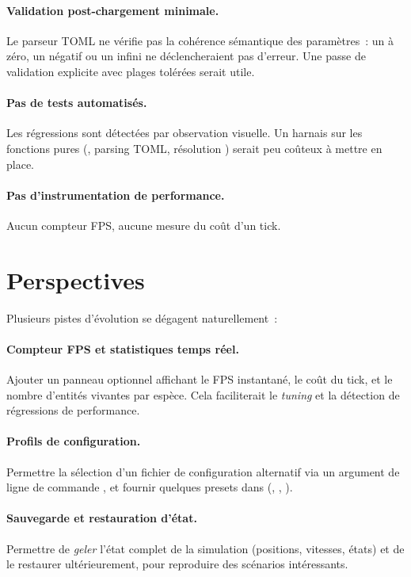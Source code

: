 \paragraph{Validation post-chargement minimale.} Le parseur
TOML ne vérifie pas la cohérence sémantique des paramètres~: un
 à zéro, un  négatif ou un
 infini ne déclencheraient pas d'erreur. Une
passe de validation explicite avec plages tolérées serait utile.

\paragraph{Pas de tests automatisés.} Les régressions sont
détectées par observation visuelle. Un harnais sur les fonctions
pures (, parsing TOML, résolution )
serait peu coûteux à mettre en place.

\paragraph{Pas d'instrumentation de performance.} Aucun
compteur FPS, aucune mesure du coût d'un tick.

\section{Perspectives}

Plusieurs pistes d'évolution se dégagent naturellement~:

\paragraph{Compteur FPS et statistiques temps réel.} Ajouter un
panneau optionnel affichant le FPS instantané, le coût du tick,
et le nombre d'entités vivantes par espèce. Cela faciliterait
le \emph{tuning} et la détection de régressions de performance.

\paragraph{Profils de configuration.} Permettre la sélection
d'un fichier de configuration alternatif via un argument de
ligne de commande , et fournir
quelques presets dans  (,
, ).

\paragraph{Sauvegarde et restauration d'état.} Permettre de
\emph{geler} l'état complet de la simulation (positions,
vitesses, états) et de le restaurer ultérieurement, pour
reproduire des scénarios intéressants.

